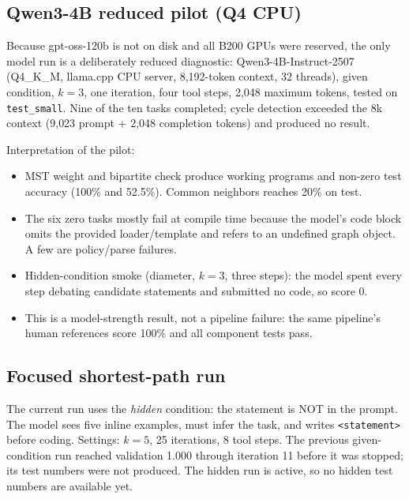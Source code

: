 \documentclass[11pt]{article}
\begin{document}
\subsection{Qwen3-4B reduced pilot (Q4 CPU)}

Because gpt-oss-120b is not on disk and all B200 GPUs were reserved, the only
model run is a deliberately reduced diagnostic: Qwen3-4B-Instruct-2507
(Q4\_K\_M, llama.cpp CPU server, 8{,}192-token context, 32 threads), given
condition, $k=3$, one iteration, four tool steps, 2{,}048 maximum tokens,
tested on \texttt{test\_small}. Nine of the ten tasks completed; cycle
detection exceeded the 8k context (9{,}023 prompt + 2{,}048 completion tokens)
and produced no result.

\begin{table}[h]
\centering
\small

\caption{Reduced Qwen3-4B pilot (Q4 CPU, $k=3$, one iteration, four steps).
Cycle detection is absent because it exceeded the 8k context. ``--'' means the
submission did not compile, so no test was run.}
\end{table}

Interpretation of the pilot:

\begin{itemize}[leftmargin=1.4em]
\item MST weight and bipartite check produce working programs and non-zero
test accuracy (100\% and 52.5\%). Common neighbors reaches 20\% on test.
\item The six zero tasks mostly fail at compile time because the model's code
block omits the provided loader/template and refers to an undefined graph
object. A few are policy/parse failures.
\item Hidden-condition smoke (diameter, $k=3$, three steps): the model spent
every step debating candidate statements and submitted no code, so score 0.
\item This is a model-strength result, not a pipeline failure: the same
pipeline's human references score 100\% and all component tests pass.
\end{itemize}

\subsection{Focused shortest-path run}
The current run uses the \emph{hidden} condition: the statement is NOT in the
prompt. The model sees five inline examples, must infer the task, and writes
\texttt{<statement>} before coding. Settings: $k=5$, 25 iterations, 8 tool
steps. The previous given-condition run reached validation 1.000 through
iteration 11 before it was stopped; its test numbers were not produced. The
hidden run is active, so no hidden test numbers are available yet.
\end{document}
